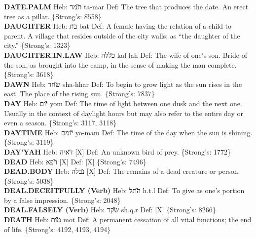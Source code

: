 {\textbf{DATE.PALM} Heb: {\large\H תמר} ta-mar Def: The tree that produces the date. An erect tree as a pillar. \{Strong's: 8558\}\hfill{}\\

\textbf{DAUGHTER} Heb: {\large\H בת} bat Def: A female having the relation of a child to parent. A village that resides outside of the city walls; as ``the daughter of the city.'' \{Strong's: 1323\}\hfill{}\\

\textbf{DAUGHTER.IN.LAW} Heb: {\large\H כללה} kal-lah Def: The wife of one’s son. Bride of the son, as brought into the camp, in the sense of making the man complete. \{Strong's: 3618\}\hfill{}\\

\textbf{DAWN} Heb: {\large\H שחר} sha-hhar Def: To begin to grow light as the sun rises in the east. The place of the rising sun. \{Strong's: 7837\}\hfill{}\\

\textbf{DAY} Heb: {\large\H יום} yom Def: The time of light between one dusk and the next one. Usually in the context of daylight hours but may also refer to the entire day or even a season. \{Strong's: 3117, 3118\}\hfill{}\\

\textbf{DAYTIME} Heb: {\large\H יומם} yo-mam Def: The time of the day when the sun is shining. \{Strong's: 3119\}\hfill{}\\

\textbf{DAY'YAH} Heb: {\large\H דאיה} {[}X{]} Def: An unknown bird of prey. \{Strong's: 1772\}\hfill{}\\

\textbf{DEAD} Heb: {\large\H רפא} {[}X{]} Def: {[}X{]} \{Strong's: 7496\}\hfill{}\\

\textbf{DEAD.BODY} Heb: {\large\H נבלה} {[}X{]} Def: The remains of a dead creature or person. \{Strong's: 5038\}\hfill{}\\

\textbf{DEAL.DECEITFULLY (Verb)} Heb: {\large\H התל} h.t.l Def: To give as one's portion by a false impression. \{Strong's: 2048\}\hfill{}\\

\textbf{DEAL.FALSELY (Verb)} Heb: {\large\H שקר} sh.q.r Def: {[}X{]} \{Strong's: 8266\}\hfill{}\\

\textbf{DEATH} Heb: {\large\H מות} mot Def: A permanent cessation of all vital functions; the end of life. \{Strong's: 4192, 4193, 4194\}\hfill{}\\

}

